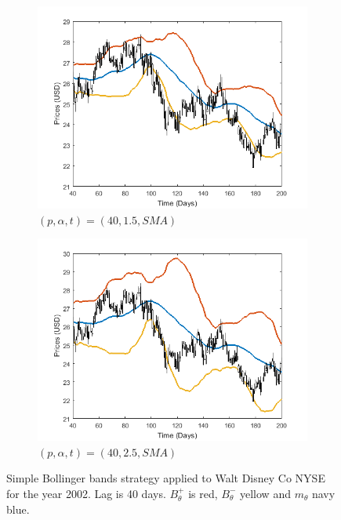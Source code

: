 \documentclass[11pt,a4,twosided,singlespacing,titlepagenumber=on]{scrreprt}
\numberwithin{equation}{chapter} %
\theoremstyle{remark}
\begin{document}
\begin{figure}[H]
    \centering
    \begin{subfigure}[t]{0.49\textwidth}
        \centering
        \includegraphics[width=1\textwidth]{bollinger/3}
        \caption{$(p, \alpha, t) = (40,1.5, SMA)$}
        \label{bollinger3}
    \end{subfigure}
    \begin{subfigure}[t]{0.49\textwidth}
        \centering
        \includegraphics[width=1\textwidth]{bollinger/4}
        \caption{$(p, \alpha, t) = (40,2.5, SMA)$}
        \label{bollinger4}
    \end{subfigure}
    \caption{Simple Bollinger bands strategy applied to Walt Disney Co NYSE for the year 2002. Lag is 40 days. $B^+_\theta$ is red, $B^-_\theta$ yellow and $m_\theta$ navy blue.}
    \label{bollinger_bands_intro_2}
\end{figure}
\end{document}
